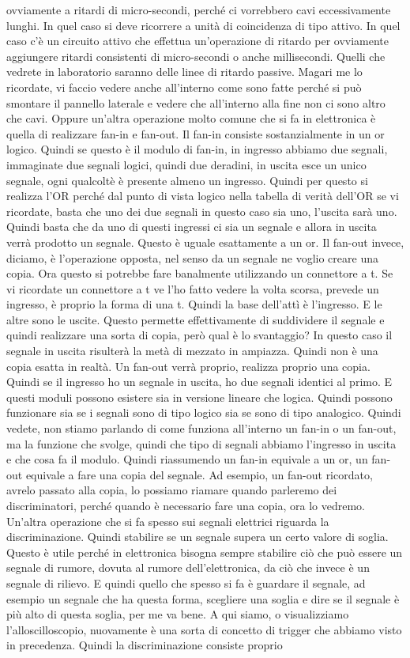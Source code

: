 {ovviamente a ritardi di micro-secondi, perché ci vorrebbero cavi eccessivamente lunghi. In quel caso si deve ricorrere a unità di coincidenza di tipo attivo. In quel caso c'è un circuito attivo che effettua un'operazione di ritardo per ovviamente aggiungere ritardi consistenti di micro-secondi o anche millisecondi. Quelli che vedrete in laboratorio saranno delle linee di ritardo passive. Magari me lo ricordate, vi faccio vedere anche all'interno come sono fatte perché si può smontare il pannello laterale e vedere che all'interno alla fine non ci sono altro che cavi. Oppure un'altra operazione molto comune che si fa in elettronica è quella di realizzare fan-in e fan-out. Il fan-in consiste sostanzialmente in un or logico. Quindi se questo è il modulo di fan-in, in ingresso abbiamo due segnali, immaginate due segnali logici, quindi due deradini, in uscita esce un unico segnale, ogni qualcoltè è presente almeno un ingresso. Quindi per questo si realizza l'OR perché dal punto di vista logico nella tabella di verità dell'OR se vi ricordate, basta che uno dei due segnali in questo caso sia uno, l'uscita sarà uno. Quindi basta che da uno di questi ingressi ci sia un segnale e allora in uscita verrà prodotto un segnale. Questo è uguale esattamente a un or. Il fan-out invece, diciamo, è l'operazione opposta, nel senso da un segnale ne voglio creare una copia. Ora questo si potrebbe fare banalmente utilizzando un connettore a t. Se vi ricordate un connettore a t ve l'ho fatto vedere la volta scorsa, prevede un ingresso, è proprio la forma di una t. Quindi la base dell'attì è l'ingresso. E le altre sono le uscite. Questo permette effettivamente di suddividere il segnale e quindi realizzare una sorta di copia, però qual è lo svantaggio? In questo caso il segnale in uscita risulterà la metà di mezzato in ampiazza. Quindi non è una copia esatta in realtà. Un fan-out verrà proprio, realizza proprio una copia. Quindi se il ingresso ho un segnale in uscita, ho due segnali identici al primo. E questi moduli possono esistere sia in versione lineare che logica. Quindi possono funzionare sia se i segnali sono di tipo logico sia se sono di tipo analogico. Quindi vedete, non stiamo parlando di come funziona all'interno un fan-in o un fan-out, ma la funzione che svolge, quindi che tipo di segnali abbiamo l'ingresso in uscita e che cosa fa il modulo. Quindi riassumendo un fan-in equivale a un or, un fan-out equivale a fare una copia del segnale. Ad esempio, un fan-out ricordato, avrelo passato alla copia, lo possiamo riamare quando parleremo dei discriminatori, perché quando è necessario fare una copia, ora lo vedremo. Un'altra operazione che si fa spesso sui segnali elettrici riguarda la discriminazione. Quindi stabilire se un segnale supera un certo valore di soglia. Questo è utile perché in elettronica bisogna sempre stabilire ciò che può essere un segnale di rumore, dovuta al rumore dell'elettronica, da ciò che invece è un segnale di rilievo. E quindi quello che spesso si fa è guardare il segnale, ad esempio un segnale che ha questa forma, scegliere una soglia e dire se il segnale è più alto di questa soglia, per me va bene. A qui siamo, o visualizziamo l'alloscilloscopio, nuovamente è una sorta di concetto di trigger che abbiamo visto in precedenza. Quindi la discriminazione consiste proprio }
